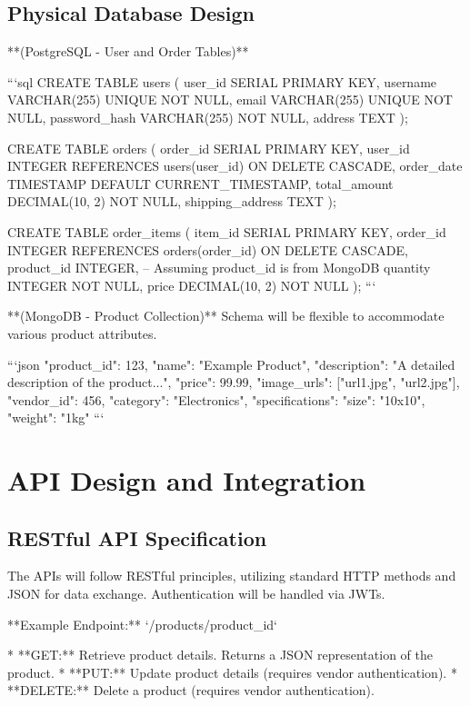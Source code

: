 \documentclass[11pt,a4paper,oneside]{article}
\begin{document}
\subsection{Physical Database Design}

**(PostgreSQL - User and Order Tables)**

```sql
CREATE TABLE users (
    user_id SERIAL PRIMARY KEY,
    username VARCHAR(255) UNIQUE NOT NULL,
    email VARCHAR(255) UNIQUE NOT NULL,
    password_hash VARCHAR(255) NOT NULL,
    address TEXT
);

CREATE TABLE orders (
    order_id SERIAL PRIMARY KEY,
    user_id INTEGER REFERENCES users(user_id) ON DELETE CASCADE,
    order_date TIMESTAMP DEFAULT CURRENT_TIMESTAMP,
    total_amount DECIMAL(10, 2) NOT NULL,
    shipping_address TEXT
);

CREATE TABLE order_items (
    item_id SERIAL PRIMARY KEY,
    order_id INTEGER REFERENCES orders(order_id) ON DELETE CASCADE,
    product_id INTEGER, -- Assuming product_id is from MongoDB
    quantity INTEGER NOT NULL,
    price DECIMAL(10, 2) NOT NULL
);
```

**(MongoDB - Product Collection)**  Schema will be flexible to accommodate various product attributes.

```json
{
  "product_id": 123,
  "name": "Example Product",
  "description": "A detailed description of the product...",
  "price": 99.99,
  "image_urls": ["url1.jpg", "url2.jpg"],
  "vendor_id": 456,
  "category": "Electronics",
  "specifications": {
    "size": "10x10",
    "weight": "1kg"
  }
}
```

\section{API Design and Integration}

\subsection{RESTful API Specification}

The APIs will follow RESTful principles, utilizing standard HTTP methods and JSON for data exchange.  Authentication will be handled via JWTs.

**Example Endpoint:**  `/products/{product_id}`

* **GET:** Retrieve product details.  Returns a JSON representation of the product.
* **PUT:** Update product details (requires vendor authentication).
* **DELETE:** Delete a product (requires vendor authentication).
\end{document}
